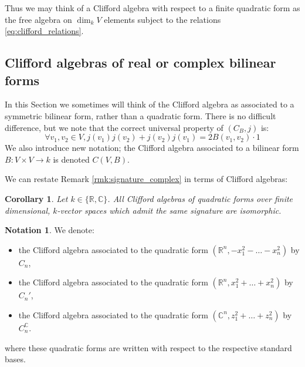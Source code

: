 \documentclass[12pt]{article}
\theoremstyle{plain}
\newtheorem{cor}[thm]{Corollary}
\theoremstyle{definition}
\newtheorem{notation}[thm]{Notation}
\newcommand{\bb}[1]{\mathbb{#1}}
\newcommand{\lto}{\longrightarrow}
\begin{document}
Thus we may think of a Clifford algebra with respect to a finite quadratic form as the free algebra on $\operatorname{dim}_kV$ elements subject to the relations \eqref{eq:clifford_relations}.

\subsection{Clifford algebras of real or complex bilinear forms}
In this Section we sometimes will think of the Clifford algebra as associated to a symmetric bilinear form, rather than a quadratic form. There is no difficult difference, but we note that the correct universal property of $(C_B,j)$ is:
\begin{equation}
	\forall v_1,v_2 \in V, j(v_1)j(v_2) + j(v_2)j(v_1) = 2B(v_1,v_2)\cdot 1
\end{equation}
We also introduce new notation; the Clifford algebra associated to a bilinear form $B: V \times V \lto k$ is denoted $C(V,B)$.

We can restate Remark \ref{rmk:signature_complex} in terms of Clifford algebras:
\begin{cor}\label{cor:signature_determines}
	Let $k\in \lbrace \bb{R},\bb{C}\rbrace$. All Clifford algebras of quadratic forms over finite dimensional, $k$-vector spaces which admit the same signature are isomorphic.
\end{cor}
\begin{notation}
	We denote:
	\begin{itemize}
		\item the Clifford algebra associated to the quadratic form $(\bb{R}^n, -x_1^2 - \hdots - x_n^2)$ by $C_n$,
		\item the Clifford algebra associated to the quadratic form $(\bb{R}^n, x_1^2 + \hdots + x_n^2)$ by $C_n'$,
		\item the Clifford algebra associated to the quadratic form $(\bb{C}^n, z_1^2 + \hdots + z_n^2)$ by $C_n^{\bb{C}}$.
	\end{itemize}
where these quadratic forms are written with respect to the respective standard bases.
\end{notation}
\end{document}
